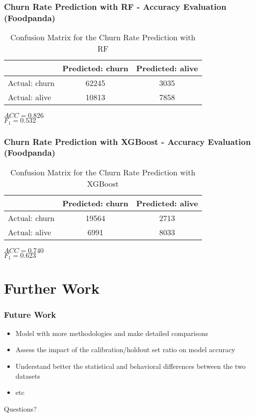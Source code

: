 \documentclass{beamer} %
\theoremstyle{definition} %
\begin{document}
\begin{frame}
\frametitle{Churn Rate Prediction with RF - Accuracy Evaluation (Foodpanda)}
\begin{center}
            \begin{table}
\begin{tabular}{l | c | c }
 & Predicted: churn & Predicted: alive\\
\hline \hline
Actual: churn & 62245 & 3035\\ 
Actual: alive & 10813 & 7858
\end{tabular}
\caption{Confusion Matrix for the Churn Rate Prediction with RF}
\end{table}
        \end{center}      
       
\begin{rmk}
	$ACC=0.826$ \\    
    $F_1=0.532$
\end{rmk}
\end{frame}

\begin{frame}
\frametitle{Churn Rate Prediction with XGBoost - Accuracy Evaluation (Foodpanda)}
\begin{center}
            \begin{table}
\begin{tabular}{l | c | c }
 & Predicted: churn & Predicted: alive\\
\hline \hline
Actual: churn & 19564 & 2713\\ 
Actual: alive & 6991 & 8033
\end{tabular}
\caption{Confusion Matrix for the Churn Rate Prediction with XGBoost}
\end{table}
        \end{center}      
       
\begin{rmk}
	$ACC=0.740$ \\    
    $F_1=0.623$
\end{rmk}
\end{frame}

\section{Further Work} %
\begin{frame}
\frametitle{Future Work}
\begin{itemize}
\item Model with more methodologies and make detailed comparisons
\item Assess the impact of the calibration/holdout set ratio on model accuracy
\item Understand better the statistical and behavioral differences between the two datasets
\item etc
\end{itemize}
\end{frame}

\begin{frame}
Questions?
\end{frame}

\end{document}
